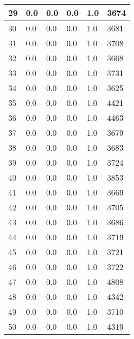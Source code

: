 \begin{longtable}{|l|l|l|l|l|l|}
29 & 0.0 & 0.0 & 0.0 & 1.0 & 3674 \\ \hline 
30 & 0.0 & 0.0 & 0.0 & 1.0 & 3681 \\ \hline 
31 & 0.0 & 0.0 & 0.0 & 1.0 & 3708 \\ \hline 
32 & 0.0 & 0.0 & 0.0 & 1.0 & 3668 \\ \hline 
33 & 0.0 & 0.0 & 0.0 & 1.0 & 3731 \\ \hline 
34 & 0.0 & 0.0 & 0.0 & 1.0 & 3625 \\ \hline 
35 & 0.0 & 0.0 & 0.0 & 1.0 & 4421 \\ \hline 
36 & 0.0 & 0.0 & 0.0 & 1.0 & 4463 \\ \hline 
37 & 0.0 & 0.0 & 0.0 & 1.0 & 3679 \\ \hline 
38 & 0.0 & 0.0 & 0.0 & 1.0 & 3683 \\ \hline 
39 & 0.0 & 0.0 & 0.0 & 1.0 & 3724 \\ \hline 
40 & 0.0 & 0.0 & 0.0 & 1.0 & 3853 \\ \hline 
41 & 0.0 & 0.0 & 0.0 & 1.0 & 3669 \\ \hline 
42 & 0.0 & 0.0 & 0.0 & 1.0 & 3705 \\ \hline 
43 & 0.0 & 0.0 & 0.0 & 1.0 & 3686 \\ \hline 
44 & 0.0 & 0.0 & 0.0 & 1.0 & 3719 \\ \hline 
45 & 0.0 & 0.0 & 0.0 & 1.0 & 3721 \\ \hline 
46 & 0.0 & 0.0 & 0.0 & 1.0 & 3722 \\ \hline 
47 & 0.0 & 0.0 & 0.0 & 1.0 & 4808 \\ \hline 
48 & 0.0 & 0.0 & 0.0 & 1.0 & 4342 \\ \hline 
49 & 0.0 & 0.0 & 0.0 & 1.0 & 3710 \\ \hline 
50 & 0.0 & 0.0 & 0.0 & 1.0 & 4319 \\ \hline 
\end{longtable}